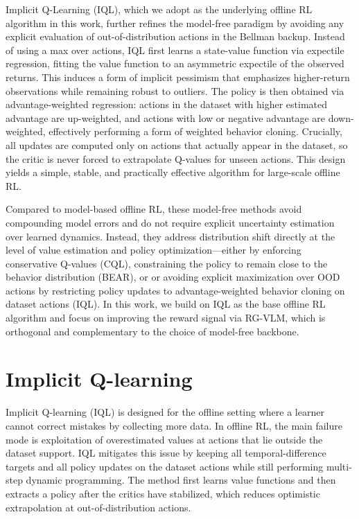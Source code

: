 \documentclass[master,english,final]{kaist-ucs}
\begin{document}
Implicit Q-Learning (IQL)\cite{kostrikov2021offline}, which we adopt as the underlying offline RL algorithm in this work, further refines the model-free paradigm by avoiding any explicit evaluation of out-of-distribution actions in the Bellman backup. Instead of using a max over actions, IQL first learns a state-value function via expectile regression, fitting the value function to an asymmetric expectile of the observed returns. This induces a form of implicit pessimism that emphasizes higher-return observations while remaining robust to outliers. The policy is then obtained via advantage-weighted regression: actions in the dataset with higher estimated advantage are up-weighted, and actions with low or negative advantage are down-weighted, effectively performing a form of weighted behavior cloning. Crucially, all updates are computed only on actions that actually appear in the dataset, so the critic is never forced to extrapolate Q-values for unseen actions. This design yields a simple, stable, and practically effective algorithm for large-scale offline RL.

Compared to model-based offline RL, these model-free methods avoid compounding model errors and do not require explicit uncertainty estimation over learned dynamics. Instead, they address distribution shift directly at the level of value estimation and policy optimization—either by enforcing conservative Q-values (CQL\cite{kumar2020conservative}), constraining the policy to remain close to the behavior distribution (BEAR\cite{kumar2019stabilizing}), or or avoiding explicit maximization over OOD actions by restricting policy updates to advantage-weighted behavior cloning on dataset actions (IQL\cite{kostrikov2021offline}). In this work, we build on IQL as the base offline RL algorithm and focus on improving the reward signal via RG-VLM, which is orthogonal and complementary to the choice of model-free backbone.


\section{Implicit Q-learning}
Implicit Q-learning (IQL)\cite{kostrikov2021offline} is designed for the offline setting where a learner cannot correct mistakes by collecting more data. In offline RL, the main failure mode is exploitation of overestimated values at actions that lie outside the dataset support. IQL mitigates this issue by keeping all temporal-difference targets and all policy updates on the dataset actions while still performing multi-step dynamic programming. The method first learns value functions and then extracts a policy after the critics have stabilized, which reduces optimistic extrapolation at out-of-distribution actions.
\end{document}
